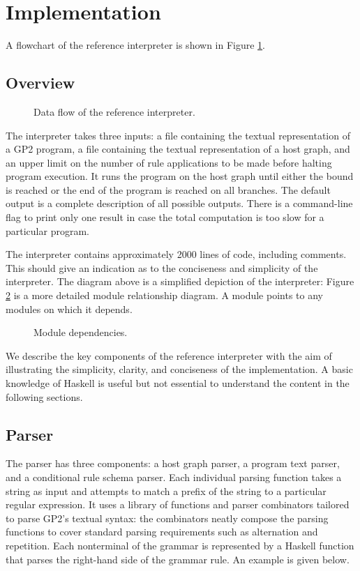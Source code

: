 \section{Implementation}
\label{sec:implementation}

A flowchart of the reference interpreter is shown in Figure \ref{fig:architecture}.
\subsection{Overview}

\begin{figure}
\centering

\caption{Data flow of the reference interpreter.} \label{fig:architecture}
\end{figure}

The interpreter takes three inputs: a file containing the textual representation of a GP2 program, a file containing the textual representation of a host graph, and an upper limit on the number of rule applications to be made before halting program execution. It runs the program on the host graph until either the bound is reached or the end of the program is reached on all branches. The default output is a complete description of all possible outputs. There is a command-line flag to print only one result in case the total computation is too slow for a particular program.

The interpreter contains approximately 2000 lines of code, including comments. This should give an indication as to the conciseness and simplicity of the interpreter. The diagram above is a simplified depiction of the interpreter: Figure \ref{fig:modules} is a more detailed module relationship diagram. A module points to any modules on which it depends. 

\begin{figure}
\centering

\caption{Module dependencies.} \label{fig:modules}
\end{figure}

We describe the key components of the reference interpreter with the aim of illustrating the simplicity, clarity, and conciseness of the implementation. A basic knowledge of Haskell is useful but not essential to understand the content in the following sections.

\subsection{Parser}
The parser has three components: a host graph parser, a program text parser, and a conditional rule schema parser. Each individual parsing function takes a string as input and attempts to match a prefix of the string to a particular regular expression. It uses a library of functions and parser combinators tailored to parse GP2's textual syntax: the combinators neatly compose the parsing functions to cover standard parsing requirements such as alternation and repetition. Each nonterminal of the grammar is represented by a Haskell function that parses the right-hand side of the grammar rule. An example is given below.

